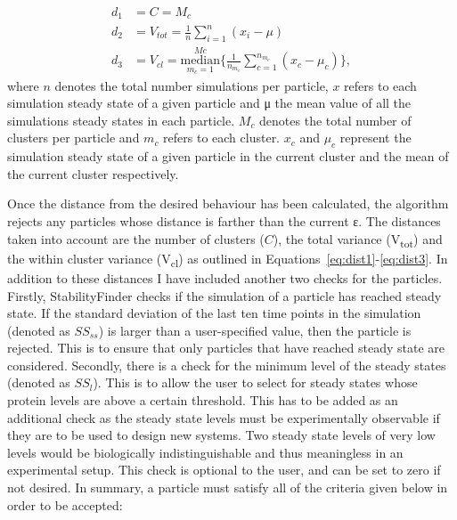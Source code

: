 \begin{align}
	d_1 &= C = M_c \label{eq:dist1}\\
	d_2 &= V_{tot} = \frac{1}{n} \sum_{i=1}^{n}(x_i- \mu)	\label{eq:dist1}\\
	d_3 &= V_{cl} =  \underset{m_c = 1}{\overset{Mc}{\mathrm{median}}} \{ \frac{1}{n_{m_c}} \sum_{c=1}^{n_{m_c}}(x_c- \mu_c)\} \label{eq:dist3},
\end{align}
where $n$ denotes the total number simulations per particle, $x$ refers to each  simulation steady state of a given particle and μ the mean value of all the simulations steady states in each particle. $M_c$ denotes the total number of clusters per particle and $m_c$ refers to each cluster. $x_c$ and $\mu_c$ represent the simulation steady state of a given particle in the current cluster and the mean of the current cluster respectively.   



Once the distance from the desired behaviour has been calculated, the algorithm rejects any particles whose distance is farther than the current ε. The distances taken into account are the number of clusters ($C$), the total variance (V\textsubscript{tot}) and the within cluster variance (V\textsubscript{cl}) as outlined in Equations~\ref{eq:dist1}-\ref{eq:dist3}. In addition to these distances I have included another two checks for the particles. Firstly, StabilityFinder checks if the simulation of a particle has reached steady state. If the standard deviation of the last ten time points in the simulation (denoted as $SS_{ss}$) is larger than a user-specified value, then the particle is rejected. This is to ensure that only particles that have reached steady state are considered. Secondly, there is a check for the minimum level of the steady states (denoted as $SS_{l}$). This is to allow the user to select for steady states whose protein levels are above a certain threshold. This has to be added as an additional check as the steady state levels must be experimentally observable if they are to be used to design new systems. Two steady state levels of very low levels would be biologically indistinguishable and thus meaningless in an experimental setup. This check is optional to the user, and can be set to zero if not desired. In summary, a particle must satisfy all of the criteria given below in order to be accepted:

